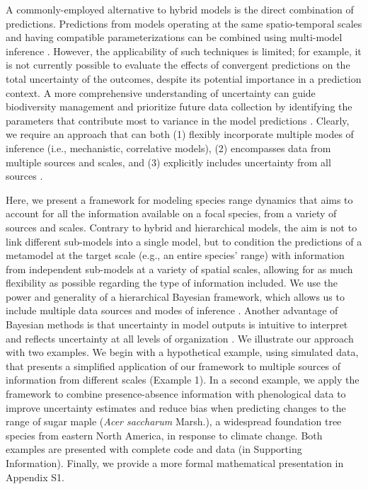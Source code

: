 \documentclass[11pt]{article}
\begin{document}
A commonly-employed alternative to hybrid models is the direct combination of predictions.
Predictions from models operating at the same spatio-temporal scales and having compatible parameterizations can be combined using multi-model inference \citep[e.g., model averaging, ensemble forecasting;][]{Thuiller2004, Araujo2007}. 
However, the applicability of such techniques is limited; for example, it is not currently possible to evaluate the effects of convergent predictions on the total uncertainty of the outcomes, despite its potential importance in a prediction context.
A more comprehensive understanding of uncertainty can guide biodiversity management and prioritize future data collection by identifying the parameters that contribute most to variance in the model predictions \citep{McMahon2011}. 
Clearly, we require an approach that can both (1) flexibly incorporate multiple modes of inference (i.e., mechanistic, correlative models), (2) encompasses data from multiple sources and scales, and (3) explicitly includes uncertainty from all sources \citep{Levin1992, Peters2004, Beck2012, Thuiller2013}. 

Here, we present a framework for modeling species range dynamics that aims to account for all the information available on a focal species, from a variety of sources and scales.
Contrary to hybrid and hierarchical models, the aim is not to link different sub-models into a single model, but to condition the predictions of a metamodel at the target scale (e.g., an entire species' range) with information from independent sub-models at a variety of spatial scales, allowing for as much flexibility as possible regarding the type of information included. 
We use the power and generality of a hierarchical Bayesian framework, which allows us to include multiple data sources and modes of inference \citep{VanOijen2005, Clark2006, Hobbs2011, Hartig2012}. 
Another advantage of Bayesian methods is that uncertainty in model outputs is intuitive to interpret and reflects uncertainty at all levels of organization \citep{Cressie2009, Hobbs2011}. 
We illustrate our approach with two examples.
We begin with a hypothetical example, using simulated data, that presents a simplified application of our framework to multiple sources of information from different scales (Example 1).
In a second example, we apply the framework to combine presence-absence information with phenological data to improve uncertainty estimates and reduce bias when predicting changes to the range of sugar maple (\emph{Acer saccharum} Marsh.), a widespread foundation tree species from eastern North America, in response to climate change.
Both examples are presented with complete code and data (in Supporting Information).
Finally, we provide a more formal mathematical presentation in Appendix S1.
\end{document}
